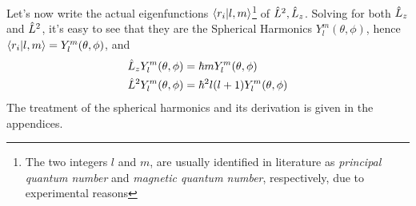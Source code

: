 \documentclass[../qm.tex]{subfiles}
\begin{document}
	Let's now write the actual eigenfunctions $\bra{r_i}\ket{l,m}$\footnote{The two integers $l$ and $m$, are usually identified in literature as \textit{principal quantum number} and \textit{magnetic quantum number}, respectively, due to experimental reasons} of $\hat{L}^2,\hat{L}_z$. Solving for both $\hat{L}_z$ and $\hat{L}^2$, it's easy to see that they are the Spherical Harmonics $Y^m_l(\theta,\phi)$, hence $\bra{r_i}\ket{l,m}=Y^m_l(\theta,\phi)$, and
	\begin{equation}
		\begin{aligned}
			\hat{L}_zY^m_l(\theta,\phi)&=\hbar mY^m_l(\theta,\phi)\\
			\hat{L}^2Y^m_l(\theta,\phi)&=\hbar^2l(l+1)Y^m_l(\theta,\phi)
		\end{aligned}
		\label{eq:orbangmomeigenf}
	\end{equation}
	The treatment of the spherical harmonics and its derivation is given in the appendices.\\
\end{document}
